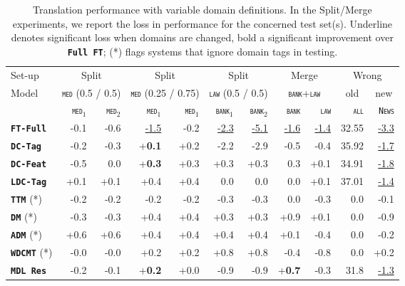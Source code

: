 \documentclass[11pt,a4paper]{article}
\newcommand{\fyTodo}[1]{\Todo[FY:]{\textcolor{orange}{#1}}}
\newcommand{\fyDone}[1]{\done[FY]\Todo[FY:]{\textcolor{orange}{#1}}}
\newcommand{\domain}[1]{\texttt{\textsc{#1}}}
\newcommand{\system}[1]{\texttt{\textbf{#1}}}
\newcommand{\SB}[1]{\textbf{#1}}
\newcommand{\SW}[1]{\underline{#1}}
\begin{document}
\begin{table*}
  \centering%
  \begin{tabular}{|p{1.8cm}|*{10}{r|}} \hline
    \hfill Set-up & \multicolumn{2}{c|}{Split} &  \multicolumn{2}{c|}{Split} & \multicolumn{2}{c|}{Split} & \multicolumn{2}{c|}{Merge} & \multicolumn{2}{c|}{Wrong} \\ %
     Model \hfill & \multicolumn{2}{c|}{\domain{med} \footnotesize{(0.5 / 0.5)}} &  \multicolumn{2}{c|}{\domain{med} {\footnotesize (0.25 / 0.75)}} & \multicolumn{2}{c|}{\domain{law} {\footnotesize (0.5 / 0.5)}} & \multicolumn{2}{c|}{\domain{bank}+\domain{law}} &  \multicolumn{1}{c|}{old} &  \multicolumn{1}{c|}{new}\\ \hline
    & \domain{med}$_1$ & \domain{med}$_2$ & \domain{med}$_1$ & \domain{med}$_1$ &  \domain{bank}$_1$ & \domain{bank}$_2$ & \domain{bank} & \domain{law}   & \domain{all} & \domain{News} \\
    \system{FT-Full}      & -0.1 & -0.6 & \SW{-1.5} & -0.2& \SW{-2.3} & \SW{-5.1} &\SW{-1.6} & \SW{-1.4}& 32.55 & \SW{-3.3}\\
    \system{DC-Tag}     & -0.2 & -0.3& +\SB{0.1}  & +0.2& -2.2 & -2.9 & -0.5 & -0.4 & 35.92 & \SW{-1.7}\\
    \system{DC-Feat}    & -0.5 & 0.0 & +\SB{0.3}   & +0.3 & +0.3 & +0.3 & 0.3 & +0.1 & 34.91 &\SW{-1.8}\\
    \system{LDC-Tag}   & +0.1 & +0.1 & +0.4 & +0.4 & 0.0 &  0.0 &  0.0 & +0.1& 37.01 & \SW{-1.4}\\ 
    \system{TTM} (*)        & -0.2 &  -0.2 & -0.2 & -0.2 & -0.3 &-0.3 &  0.0 & -0.3 & 0.0 & -0.1\\
    \system{DM} (*)           & -0.3   & -0.3  & +0.4 & +0.4 & +0.3 & +0.3 & +0.9 & +0.1 & 0.0 &-0.9\\
    \system{ADM} (*)        & +0.6   & +0.6 & +0.4 & +0.4 & +0.4 & +0.4 &  +0.1 & -0.4 & 0.0&-0.2\\
    \system{WDCMT} (*)     & -0.0    & -0.0  & +0.2 & +0.2  & +0.8 & +0.8  & -0.4 & -0.8 & 0.0 & +0.2 \\
    \system{MDL Res}   & -0.2   & -0.1 & +\SB{0.2} &+0.0 & -0.9 & -0.9 & +\SB{0.7} & -0.3 & 31.8 & \SW{-1.3}\\
    \hline
  \end{tabular}
  \caption{Translation performance with variable domain definitions. In the Split/Merge experiments, we report the loss in performance for the concerned test set(s). Underline denotes significant loss when domains are changed, bold a significant improvement over \system{Full FT}; (*) flags systems that ignore domain tags in testing.
  }
  \label{tab:redomains}
\end{table*}
\end{document}
